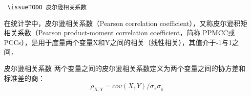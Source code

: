 
\verb | \issueTODO 皮尔逊相关系数|

在统计学中，皮尔逊相关系数（Pearson correlation coefficient），又称皮尔逊积矩相关系数（Pearson product-moment correlation coefficient，简称 PPMCC或PCCs），是用于度量两个变量X和Y之间的相关（线性相关），其值介于-1与1之间．
\begin{definition}{皮尔逊相关系数}\label{PearsR_def1}
两个变量之间的皮尔逊相关系数定义为两个变量之间的协方差和标准差的商：
\begin{equation}
\rho_{X,Y}=cov(X,Y)/\sigma_{x}\sigma_{y}
\end{equation}
\end{definition}